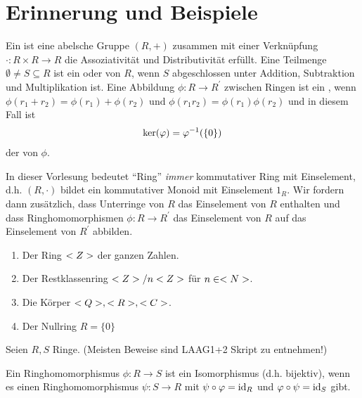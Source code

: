 \section{Erinnerung und Beispiele}

\begin{erinnerung}
	Ein  ist eine abelsche Gruppe $(R,+)$ zusammen mit einer Verknüpfung $\cdot : R\times R \to R$ die Assoziativität und Distributivität erfüllt. Eine Teilmenge $\emptyset \neq S \subseteq R$ ist ein  oder  von $R$, wenn $S$ abgeschlossen unter Addition, Subtraktion und Multiplikation ist. Eine Abbildung $\phi : R \to R^{'}$ zwischen Ringen ist ein , wenn $\phi(r_1 + r_2) = \phi(r_1) + \phi(r_2) \text{ und } \phi(r_1 r_2) = \phi(r_1) \phi(r_2)$ und in diesem Fall ist
	\begin{align}
		\ker(\phi)=\phi^{-1}(\{0\}) \notag
	\end{align}
	der  von $\phi$.
\end{erinnerung}

\begin{remark}
	In dieser Vorlesung bedeutet ``Ring'' \emph{immer} kommutativer Ring mit Einselement, d.h. $(R,\cdot)$ bildet ein kommutativer Monoid mit Einselement $1_R$. Wir fordern dann zusätzlich, dass Unterringe von $R$ das Einselement von $R$ enthalten und dass Ringhomomorphismen $\phi : R \to R^{'}$ das Einselement von $R$ auf das Einselement von $R^{'}$ abbilden.
\end{remark}

\begin{example}
	\begin{enumerate}
		\item Der Ring $\whole$ der ganzen Zahlen.
		\item Der Restklassenring $\whole / n \whole$ für $n \in \natur$.
		\item Die Körper $\ratio, \real, \comp$.
		\item Der Nullring $R = \{0\}$
	\end{enumerate}
\end{example}

Seien $R, S$ Ringe. (Meisten Beweise sind LAAG1+2 Skript zu entnehmen!)

\begin{proposition}
	Ein Ringhomomorphismus $\phi: R \to S$ ist ein Isomorphismus (d.h. bijektiv), wenn es einen Ringhomomorphismus $\psi: S \to R$ mit $\psi \circ \phi = \id_R$ und $\phi \circ \psi = \id_{S}$ gibt.
\end{proposition}

